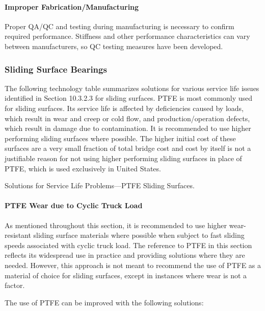 \paragraph{Improper Fabrication/Manufacturing}
Proper QA/QC and testing during manufacturing is necessary to confirm required performance. Stiffness and
other performance characteristics can vary between manufacturers, so QC testing measures have been developed.

\subsubsection{Sliding Surface Bearings}
The following technology table summarizes solutions for various service life issues identified in Section 10.3.2.3
for sliding surfaces. PTFE is most commonly used for sliding surfaces. Its service life is affected by deficiencies
caused by loads, which result in wear and creep or cold flow, and production/operation defects, which result in
damage due to contamination. It is recommended to use higher performing sliding surfaces where possible. The
higher initial cost of these surfaces are a very small fraction of total bridge cost and cost by itself is not a justifiable
reason for not using higher performing sliding surfaces in place of PTFE, which is used exclusively in United States.

\begin{table}
  \caption{Solutions for Service Life Problems—PTFE Sliding Surfaces.}\label{tab:solution-bearing-pfte}
\end{table}

\paragraph{PTFE Wear due to Cyclic Truck Load}
As mentioned throughout this section, it is recommended to use higher wear-resistant sliding surface materials
where possible when subject to fast sliding speeds associated with cyclic truck load. The reference to PTFE in this
section reflects its widespread use in practice and providing solutions where they are needed. However, this approach
is not meant to recommend the use of PTFE as a material of choice for sliding surfaces, except in instances where
wear is not a factor.

The use of PTFE can be improved with the following solutions:

